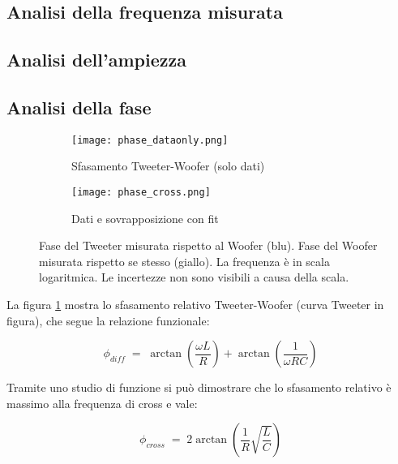 \documentclass[../Relazione_circuiti]{subfiles}
\begin{document}
\subsection{Analisi della frequenza misurata}

\subsection{Analisi dell'ampiezza}

\subsection{Analisi della fase}

\begin{figure}[H]
\centering

\begin{subfigure}{=0.5\textwidth}
\centering
\texttt{[image: phase\_dataonly.png]}

\caption{Sfasamento Tweeter-Woofer (solo dati)}
\label{fig: pdiff_dataonly}

\end{subfigure}

\begin{subfigure}{=0.5\textwidth}
\centering
\texttt{[image: phase\_cross.png]}

\caption{Dati e sovrapposizione con fit}
\label{fig: pdiff_fit_data}

\end{subfigure}

\caption{Fase del Tweeter misurata rispetto al Woofer (blu). Fase del Woofer  misurata rispetto se stesso (giallo). La frequenza è in scala logaritmica. Le incertezze non sono visibili a causa della scala.}
\label{fig: phase_diff}

\end{figure}

La figura \ref{fig: pdiff_dataonly} mostra lo sfasamento relativo Tweeter-Woofer (curva Tweeter in figura), che segue la relazione funzionale:

  \begin{equation}
    \label{eq:p_diff}
    \phi_{diff} \; = \; \arctan(\frac{\omega L}{R}) + \arctan(\frac{1}{\omega RC})
  \end{equation}
  
Tramite uno studio di funzione si può dimostrare che lo sfasamento relativo è massimo alla frequenza di cross e vale:


 \begin{equation}
    \label{eq:p_diff_cross}
    \phi_{cross} \; = \; 2 \arctan(\frac{1}{R} \sqrt{\frac{L}{C}})
  \end{equation}
\end{document}
